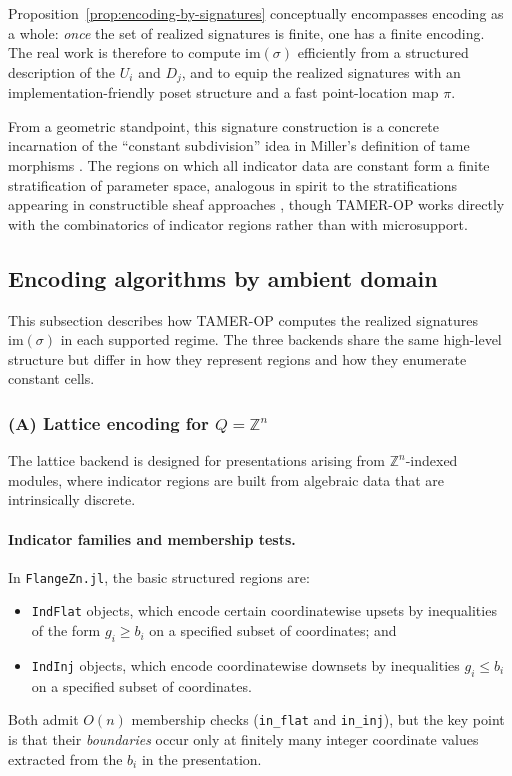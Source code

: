 \documentclass{article}
\newcommand{\<}{\langle}
\renewcommand{\>}{\rangle}
\theoremstyle{definition}
\theoremstyle{remark}
\begin{document}
	Proposition~\ref{prop:encoding-by-signatures} conceptually encompasses encoding as a whole: \emph{once} the set of realized signatures is finite, one has a finite encoding.  The real work is therefore to compute $\mathrm{im}(\sigma)$ efficiently from a structured description of the $U_i$ and $D_j$, and to equip the realized signatures with an implementation-friendly poset structure and a fast point-location map $\pi$.
	
	From a geometric standpoint, this signature construction is a concrete incarnation of the ``constant subdivision'' idea in Miller's definition of tame morphisms \cite{Mil20}.  The regions on which all indicator data are constant form a finite stratification of parameter space, analogous in spirit to the stratifications appearing in constructible sheaf approaches \cite{KS18,Mil23}, though TAMER-OP works directly with the combinatorics of indicator regions rather than with microsupport.
	
	\subsection{Encoding algorithms by ambient domain}
	\label{subsec:encoding-algorithms-by-domain}
	
	This subsection describes how TAMER-OP computes the realized signatures
	$\mathrm{im}(\sigma)$ in each supported regime.  The three backends share the same
	high-level structure but differ in how they represent regions and how they
	enumerate constant cells.
	
	\subsubsection*{(A) Lattice encoding for $Q=\mathbb{Z}^n$}
	\label{subsubsec:encoding-Zn}
	
	The lattice backend is designed for presentations arising from
	$\mathbb{Z}^n$-indexed modules, where indicator regions are built from algebraic
	data that are intrinsically discrete.
	
	\paragraph{Indicator families and membership tests.}
	In \texttt{FlangeZn.jl}, the basic structured regions are:
	\begin{itemize}
		\item \texttt{IndFlat} objects, which encode certain coordinatewise upsets by
		inequalities of the form $g_i\ge b_i$ on a specified subset of coordinates; and
		\item \texttt{IndInj} objects, which encode coordinatewise downsets by inequalities
		$g_i\le b_i$ on a specified subset of coordinates.
	\end{itemize}
	Both admit $O(n)$ membership checks (\texttt{in\_flat} and \texttt{in\_inj}),
	but the key point is that their \emph{boundaries} occur only at finitely many
	integer coordinate values extracted from the $b_i$ in the presentation.
	
\end{document}
